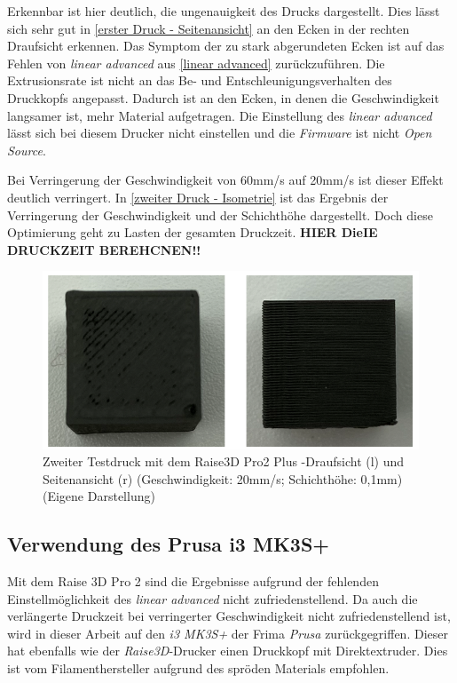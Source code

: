 Erkennbar ist hier deutlich, die ungenauigkeit des Drucks dargestellt. Dies lässt sich sehr gut in \autoref{erster Druck - Seitenansicht} an den Ecken in der rechten Draufsicht erkennen. Das Symptom der zu stark abgerundeten Ecken ist auf das Fehlen von \textit{linear advanced} aus \autoref{linear advanced} zurückzuführen. Die Extrusionsrate ist nicht an das Be- und Entschleunigungsverhalten des Druckkopfs angepasst. Dadurch ist an den Ecken, in denen die Geschwindigkeit langsamer ist, mehr Material aufgetragen. Die Einstellung des \textit{linear advanced} lässt sich bei diesem Drucker nicht einstellen und die \textit{Firmware} ist nicht \textit{Open Source}.

Bei Verringerung der Geschwindigkeit von 60mm/s auf 20mm/s ist dieser Effekt deutlich verringert. In \autoref{zweiter Druck - Isometrie} ist das Ergebnis der Verringerung der Geschwindigkeit und der Schichthöhe dargestellt. Doch diese Optimierung geht zu Lasten der gesamten Druckzeit. \textbf{HIER DieIE DRUCKZEIT BEREHCNEN!!}

\begin{figure}[h]
	\centering
	\includegraphics[width=\linewidth]{bilder/2. Testdruck auf Raise Pro 3D Seitenansicht - Draufsicht.png}
        \caption[Zweiter Testdruck mit dem Raise3D Pro2 Plus - Isometrische Ansicht] {Zweiter Testdruck mit dem Raise3D Pro2 Plus -Draufsicht (l) und Seitenansicht (r) (Geschwindigkeit: 20mm/s; Schichthöhe: 0,1mm) (Eigene Darstellung)}
	\label{zweiter Druck - Isometrie}
\end{figure}

\subsection{Verwendung des Prusa i3 MK3S+}

Mit dem Raise 3D Pro 2 sind die Ergebnisse aufgrund der fehlenden Einstellmöglichkeit des \textit{linear advanced} nicht zufriedenstellend. Da auch die verlängerte Druckzeit bei verringerter Geschwindigkeit nicht zufriedenstellend ist, wird in dieser Arbeit auf den \textit{i3 MK3S+} der Frima \textit{Prusa} zurückgegriffen. Dieser hat ebenfalls wie der \textit{Raise3D}-Drucker einen Druckkopf mit Direktextruder. Dies ist vom Filamenthersteller aufgrund des spröden Materials empfohlen.

